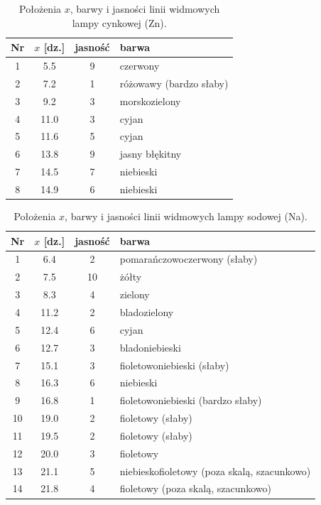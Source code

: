\documentclass[12pt, a4paper]{article}
\begin{document}
\begin{table}[H]
    \centering
    \caption{Położenia $x$, barwy i jasności linii widmowych lampy cynkowej (Zn).}\label{tab:raw_zn}
    \begin{tabular}{c S[table-format=2.1] S[table-format=2.0] l}
        \toprule
        Nr & {$x$ [dz.]} & {jasność} & barwa \\
         & 5.5 & 9 & czerwony \\
        2 & 7.2 & 1 & różowawy (bardzo słaby) \\
        3 & 9.2 & 3 & morskozielony \\
        4 & 11.0 & 3 & cyjan \\
        5 & 11.6 & 5 & cyjan \\
        6 & 13.8 & 9 & jasny błękitny \\
        7 & 14.5 & 7 & niebieski \\
        8 & 14.9 & 6 & niebieski \\
        \bottomrule
    \end{tabular}
\end{table}

\begin{table}[H]
    \centering
    \caption{Położenia $x$, barwy i jasności linii widmowych lampy sodowej (Na).}\label{tab:raw_na}
    \begin{tabular}{c S[table-format=2.1] S[table-format=2.0] l}
        \toprule
        Nr & {$x$ [dz.]} & {jasność} & barwa \\
         & 6.4 & 2 & pomarańczowoczerwony (słaby) \\
        2 & 7.5 & 10 & żółty \\
        3 & 8.3 & 4 & zielony \\
        4 & 11.2 & 2 & bladozielony \\
        5 & 12.4 & 6 & cyjan \\
        6 & 12.7 & 3 & bladoniebieski \\
        7 & 15.1 & 3 & fioletowoniebieski (słaby) \\
        8 & 16.3 & 6 & niebieski \\
        9 & 16.8 & 1 & fioletowoniebieski (bardzo słaby) \\
        10 & 19.0 & 2 & fioletowy (słaby) \\
        11 & 19.5 & 2 & fioletowy (słaby) \\
        12 & 20.0 & 3 & fioletowy \\
        13 & 21.1 & 5 & niebieskofioletowy (poza skalą, szacunkowo) \\
        14 & 21.8 & 4 & fioletowy (poza skalą, szacunkowo) \\
        \bottomrule
    \end{tabular}
\end{table}
\end{document}
